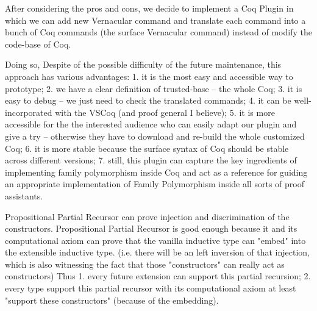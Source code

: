 After considering the pros and cons, we decide to implement a Coq Plugin in which we can add new Vernacular command and translate each command into a bunch of Coq commands (the surface Vernacular command) instead of modify the code-base of Coq. 

Doing so, Despite of the possible difficulty of the future maintenance, this approach has various advantages: 1. it is the most easy and accessible way to prototype; 2. we have a clear definition of trusted-base -- the whole Coq; 3. it is easy to debug -- we just need to check the translated commands; 4. it can be well-incorporated with the VSCoq (and proof general I believe); 5. it is more accessible for the the interested audience who can easily adapt our plugin and give a try -- otherwise they have to download and re-build the whole customized Coq; 6. it is more stable because the surface syntax of Coq should be stable across different versions; 7. still, this plugin can capture the key ingredients of implementing family polymorphism inside Coq and act as a reference for guiding an appropriate implementation of Family Polymorphism inside all sorts of proof assistants.


Propositional Partial Recursor can prove injection and discrimination of the constructors.
Propositional Partial Recursor is good enough because it and its computational axiom can prove that the vanilla inductive type can "embed" into the extensible inductive type. 
(i.e. there will be an left inversion of that injection, which is also witnessing the fact that those "constructors" can really act as constructors) 
Thus 1. every future extension can support this partial recursion; 2. every type support this partial recursor with its computational axiom at least "support these constructors" (because of the embedding).